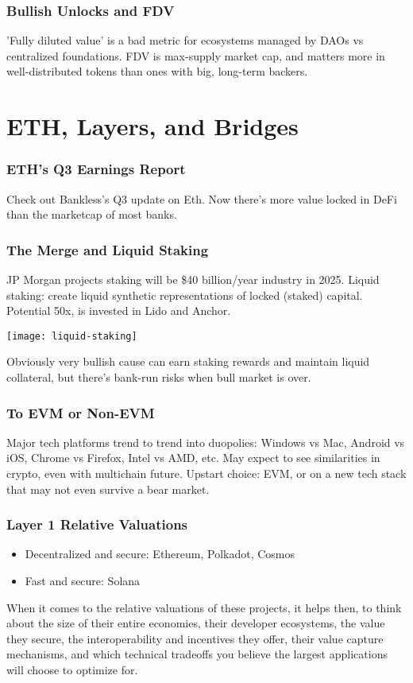 \documentclass{../notes}
\begin{document}
\section{Bullish Unlocks and FDV}
'Fully diluted value' is a bad metric for ecosystems managed by DAOs vs centralized foundations. FDV is max-supply market cap, and matters more in well-distributed tokens than ones with big, long-term backers.

\part{ETH, Layers, and Bridges}
\section{ETH's Q3 Earnings Report}
Check out Bankless's Q3 update on Eth. Now there's more value locked in DeFi than the marketcap of most banks. 

\section{The Merge and Liquid Staking}
JP Morgan projects staking will be \$40 billion/year industry in 2025. Liquid staking: create liquid synthetic representations of locked (staked) capital. Potential 50x, is invested in Lido and Anchor. 

\texttt{[image: liquid-staking]}

Obviously very bullish cause can earn staking rewards and maintain liquid collateral, but there's bank-run risks when bull market is over. 

\section{To EVM or Non-EVM}
Major tech platforms trend to trend into duopolies: Windows vs Mac, Android vs iOS, Chrome vs Firefox, Intel vs AMD, etc. May expect to see similarities in crypto, even with multichain future. Upstart choice: EVM, or on a new tech stack that may not even survive a bear market. 

\section{Layer 1 Relative Valuations}
\begin{itemize}
    \item Decentralized and secure: Ethereum, Polkadot, Cosmos
    \item Fast and secure: Solana
\end{itemize}
When it comes to the relative valuations of these projects, it helps then, to think about the size of their entire economies, their developer ecosystems, the value they secure, the interoperability and incentives they offer, their value capture mechanisms, and which technical tradeoffs you believe the largest applications will choose to optimize for.
\end{document}
